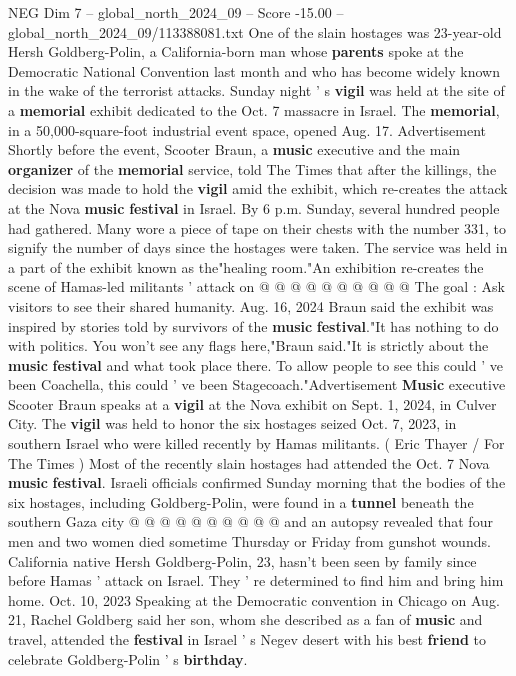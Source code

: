 \begin{textsample}{NEG Dim 7 – global\_north\_2024\_09 – Score -15.00 – global\_north\_2024\_09/113388081.txt}  \label{ex:f7_neg_001}
One of the slain hostages was 23-year-old Hersh Goldberg-Polin, a California-born man whose \textbf{parents} spoke at the Democratic National Convention last month and who has become widely known in the wake of the terrorist attacks.
Sunday night ' s \textbf{vigil} was held at the site of a \textbf{memorial} exhibit dedicated to the Oct. 7 massacre in Israel.
The \textbf{memorial}, in a 50,000-square-foot industrial event space, opened Aug. 17.
Advertisement Shortly before the event, Scooter Braun, a \textbf{music} executive and the main \textbf{organizer} of the \textbf{memorial} service, told The Times that after the killings, the decision was made to hold the \textbf{vigil} amid the exhibit, which re-creates the attack at the Nova \textbf{music} \textbf{festival} in Israel.
By 6 p.m.
Sunday, several hundred people had gathered.
Many wore a piece of tape on their chests with the number 331, to signify the number of days since the hostages were taken.
The service was held in a part of the exhibit known as the"healing room."An exhibition re-creates the scene of Hamas-led militants ' attack on @ @ @ @ @ @ @ @ @ @ The goal : Ask visitors to see their shared humanity.
Aug. 16, 2024 Braun said the exhibit was inspired by stories told by survivors of the \textbf{music} \textbf{festival}."It has nothing to do with politics.
You won't see any flags here,"Braun said."It is strictly about the \textbf{music} \textbf{festival} and what took place there.
To allow people to see this could ' ve been Coachella, this could ' ve been Stagecoach."Advertisement \textbf{Music} executive Scooter Braun speaks at a \textbf{vigil} at the Nova exhibit on Sept. 1, 2024, in Culver City.
The \textbf{vigil} was held to honor the six hostages seized Oct. 7, 2023, in southern Israel who were killed recently by Hamas militants. ( Eric Thayer / For The Times ) Most of the recently slain hostages had attended the Oct. 7 Nova \textbf{music} \textbf{festival}.
Israeli officials confirmed Sunday morning that the bodies of the six hostages, including Goldberg-Polin, were found in a \textbf{tunnel} beneath the southern Gaza city @ @ @ @ @ @ @ @ @ @ and an autopsy revealed that four men and two women died sometime Thursday or Friday from gunshot wounds.
California native Hersh Goldberg-Polin, 23, hasn't been seen by family since before Hamas ' attack on Israel.
They ' re determined to find him and bring him home.
Oct. 10, 2023 Speaking at the Democratic convention in Chicago on Aug. 21, Rachel Goldberg said her son, whom she described as a fan of \textbf{music} and travel, attended the \textbf{festival} in Israel ' s Negev desert with his best \textbf{friend} to celebrate Goldberg-Polin ' s \textbf{birthday}.

\end{textsample}
